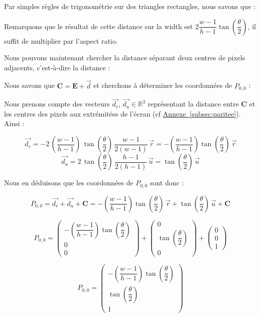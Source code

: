 Par simples règles de trigonométrie sur des triangles rectangles, nous savons que :

\triangles

Remarquons que le résultat de cette distance sur la width est $2\dfrac{w-1}{h-1}\tan(\dfrac{\theta}{2})$, il suffit de multiplier par l'aspect ratio.

Nous pouvons maintenant chercher la distance séparant deux centres de pixels adjacents, c'est-à-dire la distance :

\distanceq

Nous savons que $\mathbf{C}=\mathbf{E}+\vec{d}$ et cherchons à déterminer les coordonnées de $P_{0,0}$ :

Nous prenons compte des vecteurs $\vec{d_r}, \, \vec{d_u} \in \mathbb{R}^3$ représentant la distance entre $\mathbf{C}$ et les centres des pixels aux extrémitées de l'écran (cf \hyperref[subsec:paritee]{Annexe~\ref*{subsec:paritee}}). Ainsi : 

$$ \vec{d_{r}} = -2\, (\dfrac{w-1}{h-1})\, \tan(\dfrac{\theta}{2}) \, \dfrac{w-1}{2(w-1)}\, \vec{r} = -(\dfrac{w-1}{h-1})\tan(\dfrac{\theta}{2})\, \vec{r} $$
$$ \vec{d_{u}} = 2\, \tan(\dfrac{\theta}{2}) \, \dfrac{h-1}{2(h-1)}\, \vec{u} = \tan(\dfrac{\theta}{2})\, \vec{u} $$

Nous en déduisons que les coordonnées de $P_{0,0}$ sont donc :

$$P_{0,0}
=\vec{d_{r}}+\vec{d_{u}}+\mathbf{C}
=-(\dfrac{w-1}{h-1})\tan(\dfrac{\theta}{2})\, \vec{r}+\tan(\dfrac{\theta}{2})\, \vec{u}+\mathbf{C}$$

$$P_{0,0}
=\begin{pmatrix} -(\dfrac{w-1}{h-1})\tan(\dfrac{\theta}{2})\\[1ex] 0\\0 \end{pmatrix}+\begin{pmatrix} 0\\ \tan(\dfrac{\theta}{2})\\[1ex] 0 \end{pmatrix}+\begin{pmatrix} 0\\0\\1 \end{pmatrix}$$

$$P_{0,0}
=\begin{pmatrix} -(\dfrac{w-1}{h-1})\tan(\dfrac{\theta}{2})\\[1ex] \tan(\dfrac{\theta}{2})\\[1ex] 1 \end{pmatrix}$$

